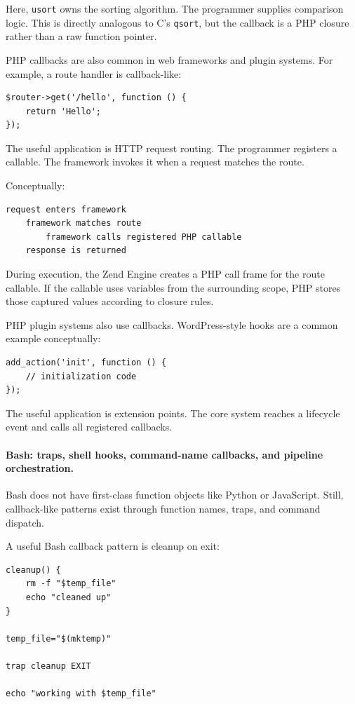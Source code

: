 Here, \texttt{usort} owns the sorting algorithm. The programmer supplies comparison logic. This is directly analogous to C's \texttt{qsort}, but the callback is a PHP closure rather than a raw function pointer.

PHP callbacks are also common in web frameworks and plugin systems. For example, a route handler is callback-like:

\begin{verbatim}
$router->get('/hello', function () {
    return 'Hello';
});
\end{verbatim}

The useful application is HTTP request routing. The programmer registers a callable. The framework invokes it when a request matches the route.

Conceptually:

\begin{verbatim}
request enters framework
    framework matches route
        framework calls registered PHP callable
    response is returned
\end{verbatim}

During execution, the Zend Engine creates a PHP call frame for the route callable. If the callable uses variables from the surrounding scope, PHP stores those captured values according to closure rules.

PHP plugin systems also use callbacks. WordPress-style hooks are a common example conceptually:

\begin{verbatim}
add_action('init', function () {
    // initialization code
});
\end{verbatim}

The useful application is extension points. The core system reaches a lifecycle event and calls all registered callbacks.

\paragraph{Bash: traps, shell hooks, command-name callbacks, and pipeline orchestration.}

Bash does not have first-class function objects like Python or JavaScript. Still, callback-like patterns exist through function names, traps, and command dispatch.

A useful Bash callback pattern is cleanup on exit:

\begin{verbatim}
cleanup() {
    rm -f "$temp_file"
    echo "cleaned up"
}

temp_file="$(mktemp)"

trap cleanup EXIT

echo "working with $temp_file"
\end{verbatim}


